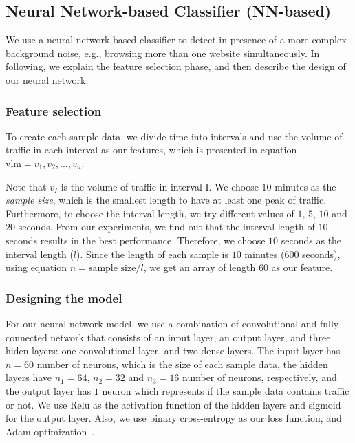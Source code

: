\subsection{Neural Network-based Classifier (NN-based)}\label{class:nn}
We use a neural network-based classifier to detect \bc in presence of a more complex background noise, e.g., browsing more than one website simultaneously. In following, we explain the feature selection phase, and then describe the design of our neural network.
\subsubsection{Feature selection}
To create each sample data, we divide time into intervals
and use the volume of traffic in each interval as our features, which is 
presented in equation $\mbox{vlm}=v_1, v_2, ..., v_{n}$. 

Note that $v_I$ is the volume of traffic in interval I. We choose $10$ minutes as the \textit{sample size}, which is the smallest length to have
at least one peak of traffic. Furthermore, to choose the interval
length, we try different values of $1$, $5$, $10$ and $20$ seconds. From our experiments, we find out 
that the interval length of $10$ seconds results in the best performance. Therefore, we choose $10$ 
seconds as the interval length ($l$). 
Since the length of each sample is $10$ minutes 
($600$ seconds), using equation $n=\mbox{sample size}/l$, we get an array of 
length $60$ as our feature.
\iffalse
\begin{equation}\label{eq:v}
 n=\mbox{sample size}/l
\end{equation}
\begin{equation}\label{eq:a}
\mbox{vlm}=v_1, v_2, ..., v_{n}
\end{equation}\fi
\subsubsection{Designing the model}
For our neural network model, we use a combination of convolutional and fully-connected network that 
consists of an input layer, an output layer, and three hiden layers: one convolutional layer, and two dense layers. The input layer has $n=60$ number of neurons, which is the size of each sample data, the hidden layers have $n_1=64$, $n_2=32$ and $n_3 = 16$ number of neurons, respectively, and the output layer has $1$ neuron which represents if the sample data contains \bc 
traffic or not. We use Relu as the activation function of the hidden layers and 
sigmoid~\cite{deep_learning_book} for the output layer. Also, we use binary cross-entropy as our loss function, and Adam optimization~\cite{adam}.%

